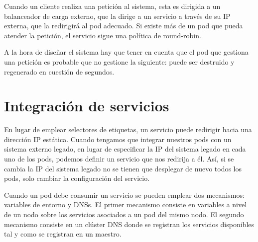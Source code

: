 \documentclass[11pt,a4paper]{article}
\begin{document}
Cuando un cliente realiza una petición al sistema, esta es dirigida a un balanceador de carga externo, que la dirige a un servicio a través de su IP externa, que la redirigirá al pod adecuado. Si existe más de un pod que pueda atender la petición, el servicio sigue una política de round-robin.

A la hora de diseñar el sistema hay que tener en cuenta que el pod que gestiona una petición es probable que no gestione la siguiente: puede ser destruido y regenerado en cuestión de segundos.

\section{Integración de servicios}

En lugar de emplear selectores de etiquetas, un servicio puede redirigir hacia una dirección IP estática. Cuando tengamos que integrar nuestros pods con un sistema externo legado, en lugar de especificar la IP del sistema legado en cada uno de los pods, podemos definir un servicio que nos redirija a él. Así, si se cambia la IP del sistema legado no se tienen que desplegar de nuevo todos los pods, solo cambiar la configuración del servicio.

Cuando un pod debe consumir un servicio se pueden emplear dos mecanismos: variables de entorno y DNSs. El primer mecanismo consiste en variables a nivel de un nodo sobre los servicios asociados a un pod del mismo nodo. El segundo mecanismo consiste en un clúster DNS
donde se registran los servicios disponibles tal y como se registran en un maestro.

\end{document}
